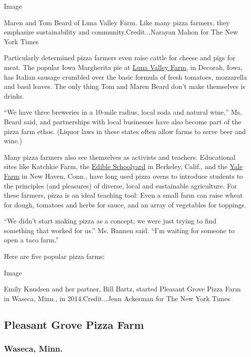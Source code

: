 Image

Maren and Tom Beard of Luna Valley Farm. Like many pizza farmers, they
emphasize sustainability and community.Credit...Narayan Mahon for The
New York Times

Particularly determined pizza farmers even raise cattle for cheese and
pigs for meat. The popular Iowa Margherita pie at
\href{https://www.lunavalleyfarm.com/}{Luna Valley Farm}, in Decorah,
Iowa, has Italian sausage crumbled over the basic formula of fresh
tomatoes, mozzarella and basil leaves. The only thing Tom and Maren
Beard don't make themselves is drinks.

``We have three breweries in a 10-mile radius, local soda and natural
wine,'' Ms. Beard said, and partnerships with local businesses have also
become part of the pizza farm ethos. (Liquor laws in these states often
allow farms to serve beer and wine.)

Many pizza farmers also see themselves as activists and teachers.
Educational sites like Katchkie Farm, the
\href{https://edibleschoolyard.org/berkeley}{Edible Schoolyard} in
Berkeley, Calif., and the
\href{https://www.sustainablefood.yale.edu/the-yale-farm}{Yale Farm} in
New Haven, Conn., have long used pizza ovens to introduce students to
the principles (and pleasures) of diverse, local and sustainable
agriculture. For these farmers, pizza is an ideal teaching tool: Even a
small farm can raise wheat for dough, tomatoes and herbs for sauce, and
an array of vegetables for toppings.

``We didn't start making pizza as a concept; we were just trying to find
something that worked for us.'' Ms. Bannen said. ``I'm waiting for
someone to open a taco farm.''

Here are five popular pizza farms:

Image

Emily Knudsen and her partner, Bill Bartz, started Pleasant Grove Pizza
Farm in Waseca, Minn., in 2014.Credit...Jenn Ackerman for The New York
Times

\hypertarget{pleasant-grove-pizza-farm}{%
\subsection{Pleasant Grove Pizza Farm}\label{pleasant-grove-pizza-farm}}

\hypertarget{waseca-minn}{%
\subsubsection{Waseca, Minn.}\label{waseca-minn}}

